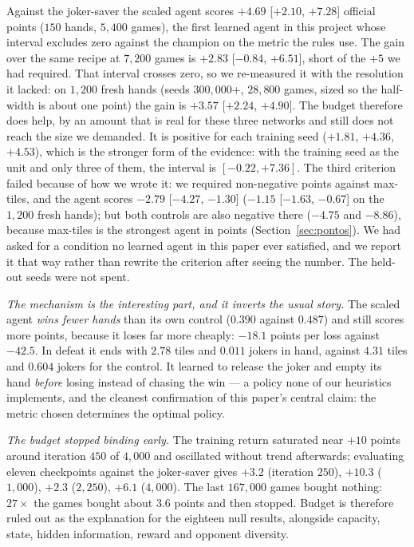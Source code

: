 \documentclass[11pt]{article}
\begin{document}
Against the joker-saver the scaled agent scores $+4.69$ [$+2.10$, $+7.28$] official points ($150$ hands, $5{,}400$ games), the first learned agent in this project whose interval excludes zero against the champion on the metric the rules use. The gain over the same recipe at $7{,}200$ games is $+2.83$ [$-0.84$, $+6.51$], short of the $+5$ we had required. That interval crosses zero, so we re-measured it with the resolution it lacked: on $1{,}200$ fresh hands (seeds $300{,}000$+, $28{,}800$ games, sized so the half-width is about one point) the gain is $+3.57$ [$+2.24$, $+4.90$]. The budget therefore does help, by an amount that is real for these three networks and still does not reach the size we demanded. It is positive for each training seed ($+1.81$, $+4.36$, $+4.53$), which is the stronger form of the evidence: with the training seed as the unit and only three of them, the interval is $[-0.22,+7.36]$. The third criterion failed because of how we wrote it: we required non-negative points against max-tiles, and the agent scores $-2.79$ [$-4.27$, $-1.30$] ($-1.15$ [$-1.63$, $-0.67$] on the $1{,}200$ fresh hands); but both controls are also negative there ($-4.75$ and $-8.86$), because max-tiles is the strongest agent in points (Section~\ref{sec:pontos}). We had asked for a condition no learned agent in this paper ever satisfied, and we report it that way rather than rewrite the criterion after seeing the number. The held-out seeds were not spent.

\emph{The mechanism is the interesting part, and it inverts the usual story.} The scaled agent \emph{wins fewer hands} than its own control ($0.390$ against $0.487$) and still scores more points, because it loses far more cheaply: $-18.1$ points per loss against $-42.5$. In defeat it ends with $2.78$ tiles and $0.011$ jokers in hand, against $4.31$ tiles and $0.604$ jokers for the control. It learned to release the joker and empty its hand \emph{before} losing instead of chasing the win --- a policy none of our heuristics implements, and the cleanest confirmation of this paper's central claim: the metric chosen determines the optimal policy.

\emph{The budget stopped binding early.} The training return saturated near $+10$ points around iteration $450$ of $4{,}000$ and oscillated without trend afterwards; evaluating eleven checkpoints against the joker-saver gives $+3.2$ (iteration $250$), $+10.3$ ($1{,}000$), $+2.3$ ($2{,}250$), $+6.1$ ($4{,}000$). The last $167{,}000$ games bought nothing: $27\times$ the games bought about $3.6$ points and then stopped. Budget is therefore ruled out as the explanation for the eighteen null results, alongside capacity, state, hidden information, reward and opponent diversity.
\end{document}
